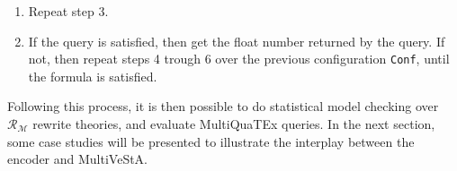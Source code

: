 \begin{enumerate}
\begin{enumerate}
\begin{maude}
{gt' | nilSL }             $\xrightarrow{chooseEvt}$      scheduleEvent({gt' | nilSL } 
{$\mathfrak{C} \ \mathfrak{M}_{j} \ \mathfrak{E}$ randomCounter(n)}              {$\mathfrak{C} \ \mathfrak{M}_{j} \ \mathfrak{E'}$ randomCounter(n+1)})\end{maude}
where $\mathfrak{E'} = \texttt{<events:Events|state:(ev(ruleQid,execute))}$.

        \item Maude reduces the terms:
        \begin{maude}
        
scheduleEvent({gt' | nilSL }  $\rightarrow$   {gt' | [gt' + 1.0 , $MG$]}   
{$\mathfrak{C} \ \mathfrak{M}_{j} \ \mathfrak{E'}$ randomCounter(n+1)})      {$\mathfrak{C} \ \mathfrak{M}_{j} \ \mathfrak{E'}$ randomCounter(n+1)})\end{maude}
    \end{enumerate}

    \item Repeat step 3.
    
    \item If the query is satisfied, then get the float number returned by the query. If not, then repeat steps 4 trough 6 over the previous configuration \texttt{Conf}, until the formula is satisfied.
\end{enumerate}
Following this process, it is then possible to do statistical model checking over $\mathscr{R}_\mathscr{M}$ rewrite theories, and evaluate MultiQuaTEx queries. In the next section, some case studies will be presented to illustrate the interplay between the encoder and MultiVeStA.
















